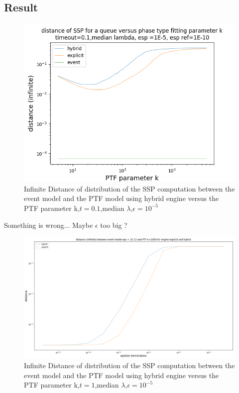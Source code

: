 \documentclass[paper=a4, fontsize=11pt]{scrartcl}
\numberwithin{equation}{section}		%
\numberwithin{figure}{section}			%
\numberwithin{table}{section}				%
\begin{document}
\clearpage
\subsection{Result}

\begin{figure}
	\centering
	\includegraphics[width=15cm]{picture/New_model/distance_constant_1E-5.png}
	\caption{Infinite Distance of distribution of the SSP computation between the event model and the PTF model using hybrid engine versus the PTF parameter k,$t=0.1$,median $\lambda$,$\epsilon=10^{-5}$}
	\label{fig:dist_const_1E-5}
\end{figure}

Something is wrong... Maybe $\epsilon$ too big ?

\begin{figure}
	\centering
	\includegraphics[width=17cm]{picture/New_model/distance_epsilon.png}
	\caption{Infinite Distance of distribution of the SSP computation between the event model and the PTF model using hybrid engine versus the PTF parameter k,$t=1$,median $\lambda$,$\epsilon=10^{-5}$}
	\label{fig:dist_epsilon_1E-13}
\end{figure}	
		
\end{document}
